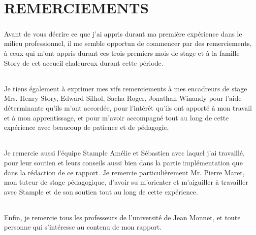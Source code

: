 \chapter{REMERCIEMENTS}
\paragraph{}
Avant de vous décrire ce que j'ai appris durant ma première expérience dans le milieu 
professionnel, il me semble opportun de commencer par des remerciements, à ceux qui m'ont 
appris durant ces trois premiers mois de stage et à la famille Story de cet accueil chaleureux 
durant cette période.
\subparagraph{}
Je tiens également à exprimer mes vifs remerciements à mes encadreurs de stage Mrs. Henry 
Story, Edward Silhol, Sacha Roger, Jonathan Winandy pour l'aide déterminante qu'ils m’ont accordée, pour l'intérêt qu'ils ont apporté à mon travail et 
à mon apprentissage, et pour m’avoir accompagné tout au long de cette expérience avec 
beaucoup de patience et de pédagogie.
\subparagraph{}
Je remercie aussi l'équipe Stample Amélie et Sébastien avec 
laquel j'ai travaillé, pour leur soutien et leurs conseils aussi bien dans la partie 
implémentation que dans la rédaction de ce rapport.
Je remercie particulièrement Mr. Pierre Maret, mon tuteur de stage pédagogique, d'avoir su 
m'orienter et m'aiguiller à travailler avec Stample et de son soutien tout au long de cette 
expérience.
\subparagraph{}
Enfin, je remercie tous les professeurs de l'université de Jean Monnet, et toute personne qui 
s'intéresse au contenu de mon rapport.